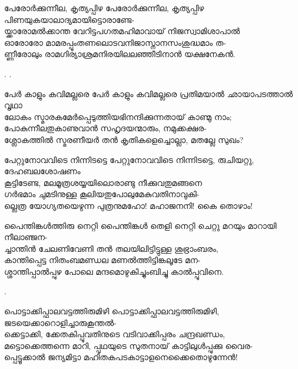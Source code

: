 \begin{enumerate}
\begin{slokam}{\VSr}{\GSK}{പേരോർക്കുന്നീല, കൃത്യപ്പിഴ}
പേരോർക്കുന്നീല, കൃത്യപ്പിഴ പിണയുകയാലാദ്യമായിട്ടൊരാണ്ടേ-\\
യ്ക്കാരോമൽക്കാന്ത വേറിട്ടപഗതമഹിമാവായ് നിജസ്വാമിശാപാൽ\\
ഓരോരോ മാമരപ്പൂംതണലൊടവനിജാസ്നാനസംശുദ്ധമാം ത-\\
ണ്ണീരോലും രാമഗിര്യാശ്രമനിരയിലലഞ്ഞീടിനാൻ യക്ഷനേകൻ.
\end{slokam}


.
.


\begin{slokam}{\VSv}{\VKG}{പേർ കാളും കവിമല്ലരെ}
 പേർ കാളും കവിമല്ലരെ പ്രതിമയാൽ ഛായാപടത്താൽ വൃഥാ\\
ലോകം സ്മാരകമേർപ്പെടുത്തിയഭിനന്ദിക്കുന്നതായ്‌ കാണ്മു നാം;\\
പോകുന്നീലതുകാണുവാൻ സഹൃദയന്മാരും, നമുക്കക്ഷര-\\
ശ്ലോകത്തിൽ സ്മരണീയർ തൻ കൃതികളെച്ചൊല്ലാ, മതല്ലേ സുഖം?
\end{slokam}


\begin{slokam}{\VKm}{\PCM}{പേറ്റുനോവവിടെ നിന്നിടട്ടെ}
 പേറ്റുനോവവിടെ നിന്നിടട്ടെ, രുചിയറ്റു, ദേഹബലശോഷണം\\
കൂട്ടിടേണ്ട, മലമൂത്രശയ്യയിലൊരാണ്ടു നീക്കുവതുമങ്ങനെ\\
ഗർഭമാം ചുമടിനുള്ള കൂലിയതുപോലുമേകുവതിനാവുകി-\\
ല്ലെത്ര യോഗ്യതയെഴുന്ന പുത്രനുമഹോ! മഹാജനനി! കൈ തൊഴാം!
\end{slokam}



\begin{slokam}{\VSv}{\VNM}{പൈന്തിങ്കൾത്തിരു നെറ്റി}
പൈന്തിങ്കൾ തെളി നെറ്റി ചെറ്റു മറയും മാറായി നീലാഞ്ജന-\\
ച്ചാന്തിൻ ചേലണിവേണി തൻ തലയിലിട്ടിട്ടുള്ള ശുഭ്രാംബരം,\\
കാന്തിപ്പെട്ട നിതംബമണ്ഡല മണൽത്തിട്ടിങ്കലൂടേ മന-\\
ശ്ശാന്തിപ്പാൽപ്പുഴ പോലെ മന്ദമൊഴുകിച്ചുംബിച്ചു കാൽപ്പൂവിനെ.
\end{slokam}


.

\begin{slokam}{\VSr}{\VNM}{പൊട്ടാക്കിപ്ഫാലവട്ടത്തിരുമിഴി}
 പൊട്ടാക്കിപ്ഫാലവട്ടത്തിരുമിഴി, ജടയെക്കാറൊളിച്ചാരുകൂന്തൽ-\\
ക്കെട്ടാക്കി, ക്കേതകിപ്പൂവതിനുടെ വടിവാക്കിപ്പരം ചന്ദ്രഖണ്ഡം,\\
മട്ടൊക്കെത്തന്നെ മാറി, പ്പൃഥയുടെ സുതനായ്‌ കാട്ടിലുള്‍പ്പുക്കു വൈര-\\
പ്പെട്ടൂക്കാൽ ജന്യമിട്ടാ മഹിതകപടകാട്ടാളനെക്കൈതൊഴുന്നേൻ!
\end{slokam}


\end{enumerate}
